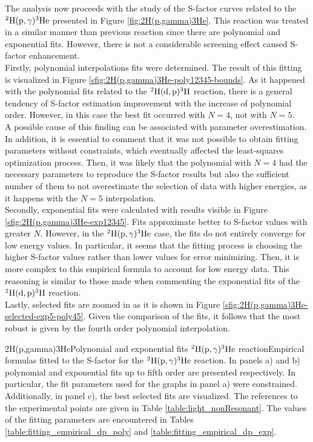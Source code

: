 \documentclass[openany]{book}
\begin{document}
The analysis now proceeds with the study of the S-factor curves related to the $\mathrm{{}^{2}H(p, \gamma){}^{3}He}$ presented in Figure \ref{fig:2H(p,gamma)3He}. This reaction was treated in a similar manner than previous reaction since there are polynomial and exponential fits. However, there is not a considerable screening effect caused S-factor enhancement. \\

Firstly, polynomial interpolations fits were determined. The result of this fitting is visualized in Figure \ref{sfig:2H(p,gamma)3He-poly12345-bounds}. As it happened with the polynomial fits related to the $\mathrm{{}^{2}H(d, p){}^{3}H}$ reaction, there is a general tendency of S-factor estimation improvement with the increase of polynomial order. However, in this case the best fit occurred with $N = 4$, not with $N = 5$. \\

A possible cause of this finding can be associated with parameter overestimation. In addition, it is essential to comment that it was not possible to obtain fitting parameters without constraints, which eventually affected the least-squares optimization process. Then, it was likely that the polynomial with $N = 4$ had the necessary parameters to reproduce the S-factor results but also the sufficient number of them to not overestimate the selection of data with higher energies, as it happens with the $N = 5$ interpolation. \\

Secondly, exponential fits were calculated with results visible in Figure \ref{sfig:2H(p,gamma)3He-exp12345}. Fits approximate better to S-factor values with greater $N$. However,  in the $\mathrm{{}^{2}H(p, \gamma){}^{3}He}$ case, the fits do not entirely converge for low energy values. In particular, it seems that the fitting process is choosing the higher S-factor values rather than lower values for error minimizing. Then, it is more complex to this empirical formula to account for low energy data. This reasoning is similar to those made when commenting the exponential fits of the $\mathrm{{}^{2}H(d, p){}^{3}H}$ reaction. \\

Lastly, selected fits are zoomed in as it is shown in Figure \ref{sfig:2H(p,gamma)3He-selected-exp5-poly45}. Given the comparison of the fits, it follows that the most robust is given by the fourth order polynomial interpolation.


{2H(p,gamma)3He}{Polynomial and exponential fits $\mathrm{{}^{2}H(p, \gamma){}^{3}He}$ reaction}{Empirical formulas fitted to the S-factor for the $\mathrm{{}^{2}H(p, \gamma){}^{3}He}$ reaction. In panels a) and b) polynomial and exponential fits up to fifth order are presented respectively.  In particular, the fit parameters used for the graphs in panel a) were constrained. Additionally, in panel c), the best selected fits are visualized. The references to the experimental points are given in Table \ref{table:light_nonResonant}. The values of the fitting parameters are encountered in Tables \ref{table:fitting_empirical_dp_poly} and \ref{table:fitting_empirical_dp_exp}.}
\end{document}
